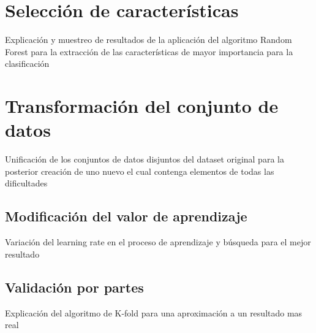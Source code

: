 
\section{Selección de características}
Explicación y muestreo de resultados de la aplicación del algoritmo Random Forest para la extracción de las características de mayor importancia para la clasificación


\section{Transformación del conjunto de datos}
Unificación de los conjuntos de datos disjuntos del dataset original para la posterior creación de uno nuevo el cual contenga elementos de todas las dificultades

\subsection{Modificación del valor de aprendizaje}
Variación del learning rate en el proceso de aprendizaje y búsqueda para el mejor resultado

\subsection{Validación por partes}
Explicación del algoritmo de K-fold para una aproximación a un resultado mas real



